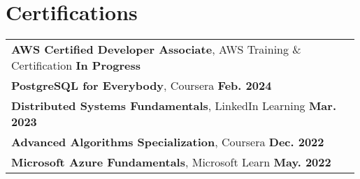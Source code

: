 \documentclass[letterpaper,11pt]{article}
\begin{document}
\section{Certifications}
\begin{tabular}{p{0.99\linewidth}}
    \hspace{0.15in}\textbf{AWS Certified Developer Associate}, AWS Training \& Certification
        \hfill \textbf{In Progress} \\
    \hspace{0.15in}\textbf{PostgreSQL for Everybody}, Coursera
        \hfill \textbf{Feb. 2024} \\
    \hspace{0.15in}\textbf{Distributed Systems Fundamentals}, LinkedIn Learning
        \hfill \textbf{Mar. 2023} \\
    \hspace{0.15in}\textbf{Advanced Algorithms Specialization}, Coursera
        \hfill \textbf{Dec. 2022} \\
    \hspace{0.15in}\textbf{Microsoft Azure Fundamentals}, Microsoft Learn
        \hfill \textbf{May. 2022} \\
\end{tabular}
\end{document}
